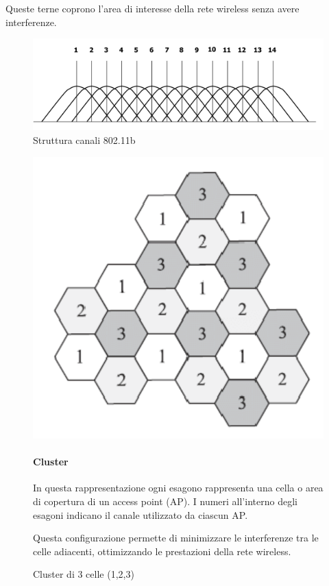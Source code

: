 Queste terne coprono l'area di interesse della rete wireless senza avere interferenze.
\begin{figure}[h!]
    \centering
    \includegraphics[scale=0.225]{images/canali802.png}
    \caption{Struttura canali 802.11b}
    \label{fig:strutturacanali}
\end{figure}




\begin{figure}[h!]
    \centering
    \begin{minipage}{0.35\textwidth}
        \includegraphics[width=\linewidth]{images/cluster3celle.png}
    \end{minipage}
    \hfill
    \begin{minipage}{0.5\textwidth}
        \paragraph{Cluster}
        In questa rappresentazione ogni esagono rappresenta una cella o area di copertura di un access point (AP). I numeri all'interno degli esagoni indicano il canale utilizzato da ciascun AP.
        
        Questa configurazione permette di minimizzare le interferenze tra le celle adiacenti, ottimizzando le prestazioni della rete wireless.
    \end{minipage}
    \caption{Cluster di 3 celle (1,2,3)}
    \label{fig:cluster3celle}
\end{figure}
\newpage
